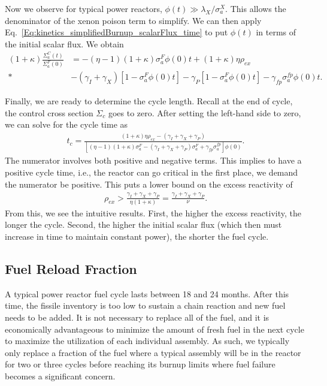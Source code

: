 Now we observe for typical power reactors, $\phi(t) \gg \lambda_X / \sigma_a^X$. This allows the denominator of the xenon poison term to simplify. We can then apply Eq.~\eqref{Eq:kinetics_simplifiedBurnup_scalarFlux_time} to put $\phi(t)$ in terms of the initial scalar flux. We obtain
\begin{align}
    (1 + \kappa) \frac{\Sigma_a^C(t)}{\Sigma_a^F(0)} 
    &= -( \eta - 1 ) (1 + \kappa)  \sigma_a^F \phi(0) t   + ( 1 + \kappa ) \eta \rho_{ex} \nonumber \\*
    &- ( \gamma_I + \gamma_X ) \left[ 1 - \sigma_a^F \phi(0) t \right]
     - \gamma_P  \left[ 1 - \sigma_a^F \phi(0) t \right] - \gamma_{fp} \sigma_a^{fp} \phi(0) t .
\end{align}

Finally, we are ready to determine the cycle length. Recall at the end of cycle, the control cross section $\Sigma_c$ goes to zero. After setting the left-hand side to zero, we can solve for the cycle time as
\begin{align}
  t_c = \frac{ ( 1 + \kappa ) \eta \rho_{ex} - ( \gamma_I + \gamma_X + \gamma_P ) }
  { \left[ ( \eta - 1 ) (1 + \kappa)  \sigma_a^F -  ( \gamma_I + \gamma_X + \gamma_P ) \sigma_a^F + \gamma_{fp} \sigma_a^{fp} \right] \phi(0) } .
\end{align}
The numerator involves both positive and negative terms. This implies to have a positive cycle time, i.e., the reactor can go critical in the first place, we demand the numerator be positive. This puts a lower bound on the excess reactivity of
\begin{align}
  \rho_{ex} > \frac{ \gamma_I + \gamma_X + \gamma_P }{ \eta ( 1 + \kappa ) } = \frac{ \gamma_I + \gamma_X + \gamma_P }{ \nu } .
\end{align}
From this, we see the intuitive results. First, the higher the excess reactivity, the longer the cycle. Second, the higher the initial scalar flux (which then must increase in time to maintain constant power), the shorter the fuel cycle.

\subsection{Fuel Reload Fraction}

A typical power reactor fuel cycle lasts between 18 and 24 months. After this time, the fissile inventory is too low to sustain a chain reaction and new fuel needs to be added. It is not necessary to replace all of the fuel, and it is economically advantageous to minimize the amount of fresh fuel in the next cycle to maximize the utilization of each individual assembly. As such, we typically only replace a fraction of the fuel where a typical assembly will be in the reactor for two or three cycles before reaching its burnup limits where fuel failure becomes a significant concern.

